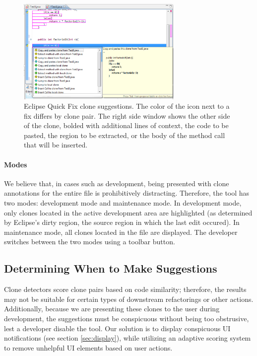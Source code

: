 \documentclass[nocopyrightspace,10pt]{sigplanconf}
\begin{document}
\begin{figure}[here]
\centering
\includegraphics[width=80mm]{img/screen1.eps}
\caption{Eclipse Quick Fix clone suggestions. The color of the icon
  next to a fix differs by clone pair. The right side window shows the
  other side of the clone, bolded with additional lines of
  context, the code to be pasted, the region to be extracted,
  or the body of the method call that will be inserted.}
\label{fig:screenshot}
\end{figure}

\paragraph{Modes}
We believe that, in cases such as development, being presented with
clone annotations for the entire file is prohibitively distracting.
Therefore, the tool has two modes: development mode and maintenance
mode.
In
development mode, only clones located in the active development area
are highlighted (as determined by Eclipse's dirty region, the source region
in which the last edit occured). In
maintenance mode, all clones located in the file are displayed. The
developer switches between the two modes using a toolbar button.

\subsection{Determining When to Make Suggestions}

Clone detectors score clone pairs based on code similarity; therefore,
the results may not be suitable for certain types of downstream
refactorings or other actions.
Additionally,
because we are presenting these clones to the user during development,
the suggestions must be conspicuous without being too obstrusive, lest
a developer disable the tool.
Our solution is to display conspicuous UI notifications
(see section \ref{sec:display}), while utilizing an 
adaptive scoring system to remove unhelpful UI elements based
on user actions.  
\end{document}
